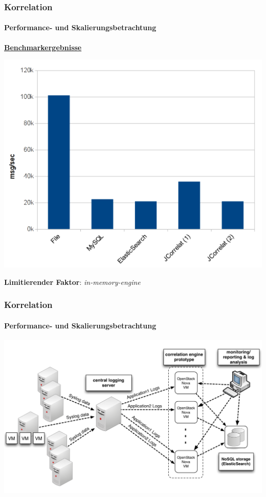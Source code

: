 \begin{frame}
\frametitle{Korrelation}
\framesubtitle{Performance- und Skalierungsbetrachtung}

\begin{center}
    \underline{\textbf{Benchmarkergebnisse}}
    
    \includegraphics[scale=0.4]{img/benchmark.png}
    
    \color{red}\textbf{Limitierender Faktor}: \textit{in-memory-engine}
\end{center}
\end{frame}


\begin{frame}
\frametitle{Korrelation}
\framesubtitle{Performance- und Skalierungsbetrachtung}

\begin{center}
    \includegraphics[scale=0.3]{img/schema_correlat-00.png}
\end{center}

\end{frame}